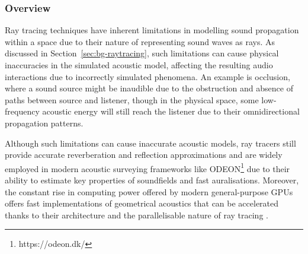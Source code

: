 \subsubsection{Overview}
Ray tracing techniques have inherent limitations in modelling sound propagation within a space due to their nature of representing sound waves as rays. As discussed in Section~\ref{sec:bg-raytracing}, such limitations can cause physical inaccuracies in the simulated acoustic model, affecting the resulting audio interactions due to incorrectly simulated phenomena. An example is occlusion, where a sound source might be inaudible due to the obstruction and absence of paths between source and listener, though in the physical space, some low-frequency acoustic energy will still reach the listener due to their omnidirectional propagation patterns. \par
Although such limitations can cause inaccurate acoustic models, ray tracers still provide accurate reverberation and reflection approximations and are widely employed in modern acoustic surveying frameworks like ODEON\footnote{https://odeon.dk/} due to their ability to estimate key properties of soundfields and fast auralisations. Moreover, the constant rise in computing power offered by modern general-purpose GPUs offers fast implementations of geometrical acoustics that can be accelerated thanks to their architecture and the parallelisable nature of ray tracing \citep{savioja2010use}. \par

